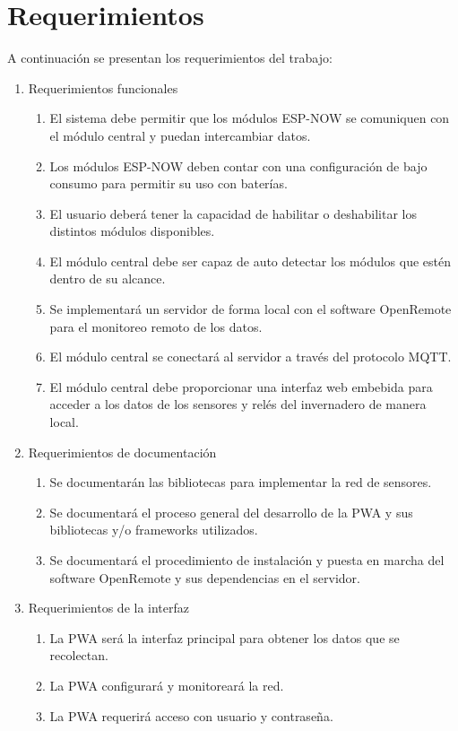 \section{Requerimientos}
A continuación se presentan los requerimientos del trabajo:
\begin{enumerate}
	\item Requerimientos funcionales
		\begin{enumerate}
			\item El sistema debe permitir que los módulos ESP-NOW se comuniquen con el módulo central y puedan intercambiar datos.
			\item Los módulos ESP-NOW deben contar con una configuración de bajo consumo para permitir su uso con baterías.
			\item El usuario deberá tener la capacidad de habilitar o deshabilitar los distintos módulos disponibles.
			\item El módulo central debe ser capaz de auto detectar los módulos que estén dentro de su alcance.
			\item Se implementará un servidor de forma local con el software OpenRemote para el monitoreo remoto de los datos.
			\item El módulo central se conectará al servidor a través del protocolo MQTT.
			\item El módulo central debe proporcionar una interfaz web embebida para acceder a los datos de los sensores y relés del invernadero de manera local.
		\end{enumerate}
	\item Requerimientos de documentación
		\begin{enumerate}
			\item Se documentarán las bibliotecas para implementar la red de sensores. 
			\item Se documentará el proceso general del desarrollo de la PWA y sus bibliotecas y/o frameworks utilizados.
			\item Se documentará el procedimiento de instalación y puesta en marcha del software OpenRemote y sus dependencias en el servidor.
		\end{enumerate}
	\item Requerimientos de la interfaz
		\begin{enumerate}
			\item La PWA será la interfaz principal para obtener los datos que se recolectan.
			\item La PWA configurará y monitoreará la red. 
			\item La PWA requerirá acceso con usuario y contraseña.

\end{enumerate}
\end{enumerate}

